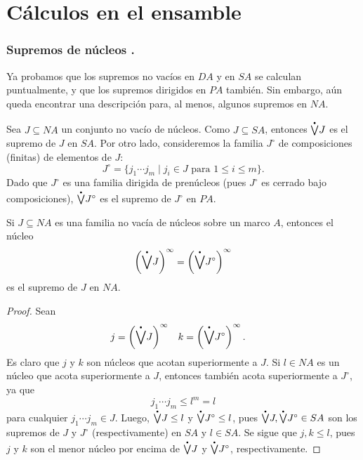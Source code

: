 \section{Cálculos en el ensamble}
\subsubsection{Supremos de núcleos .}

Ya probamos que los supremos no vacíos en $DA$ y en $SA$ se
calculan puntualmente, y que los supremos dirigidos en $PA$
también.
Sin embargo, aún queda encontrar una descripción para, al menos,
algunos supremos en $NA$.

Sea $J\subseteq NA$ un conjunto no vacío de núcleos.
Como $J\subseteq SA$, entonces $\pSup J$ es el supremo de $J$ en
$SA$.
Por otro lado, consideremos la familia $J^\circ$
de composiciones (finitas) de elementos de $J$:
\[
  J^\circ = \{j_1\cdots j_m \mid j_i\in J \text{ para } 1\leq
  i\leq m\}
.\]
Dado que $J^\circ$ es una familia dirigida de prenúcleos
(pues $J^\circ$ es cerrado bajo composiciones), $\pSup J^\circ$
es el supremo de $J^\circ$ en $PA$.

\begin{lemma}
  Si $J\subseteq NA$ es una familia no vacía de núcleos sobre un
  marco $A$, entonces el núcleo
  \[
    \left(\pSup J\right)^\infty = \left(\pSup J^\circ\right)^\infty
  \]
  es el supremo de $J$ en $NA$.
\end{lemma}
\begin{proof}
  Sean
  \begin{align*}
    j &= \left(\pSup J\right)^\infty &
    k &= \left(\pSup J^\circ\right)^\infty.
  \end{align*}
  Es claro que $j$ y $k$ son núcleos que acotan superiormente a
  $J$.
  Si $l\in NA$ es un núcleo que acota superiormente a $J$, entonces
  también acota superiormente a $J^\circ$, ya que
  \[
    j_1\cdots j_m \leq l^m = l
  \]
  para cualquier $j_1\cdots j_m\in J$.
  Luego, $\pSup J\leq l$ y $\pSup J^\circ \leq l$,
  pues $\pSup J,\pSup J^\circ\in SA$ son los supremos de $J$ y $J^\circ$
  (respectivamente) en $SA$ y $l\in SA$.
  Se sigue que $j,k\leq l$, pues $j$ y $k$ son el menor núcleo por
  encima de $\pSup J$ y $\pSup J^\circ$, respectivamente.
\end{proof}

